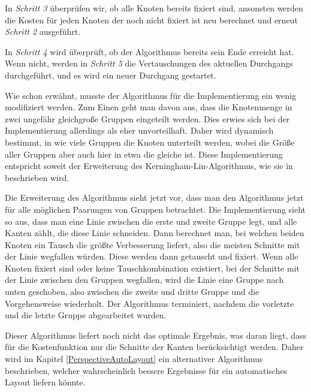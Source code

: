 In \textit{Schritt 3} überprüfen wir, ob alle Knoten bereits fixiert sind,
ansonsten werden die Kosten für jeden Knoten der noch nicht fixiert ist neu
berechnet und erneut
\textit{Schritt 2} ausgeführt.\vspace{10pt}

In \textit{Schritt 4} wird überprüft, ob der Algorithmus bereits sein Ende
erreicht hat. Wenn nicht, werden in \textit{Schritt 5} die Vertauschungen des
aktuellen Durchgangs durchgeführt, und es wird ein neuer Durchgang gestartet.\vspace{10pt}

Wie schon erwähnt, musste der Algorithmus für die Implementierung ein wenig
modifiziert werden. Zum Einen geht man davon aus, dass die
Knotenmenge in zwei ungefähr gleichgroße Gruppen eingeteilt werden. Dies erwies
sich bei der Implementierung allerdings als eher unvorteilhaft. Daher wird dynamisch
bestimmt, in wie viele Gruppen die Knoten unterteilt werden, wobei die Größe
aller Gruppen aber auch hier in etwa die gleiche ist. Diese
Implementierung entspricht soweit der Erweiterung des
Kerningham-Lin-Algorithmus, wie sie in \cite{Layout} beschrieben
wird.\vspace{10pt}

Die Erweiterung des Algorithmus sieht jetzt vor, dass man den Algorithmus jetzt
für alle möglichen Paarungen von Gruppen betrachtet. Die Implementierung
sieht so aus, dass man eine Linie zwischen die erste und zweite Gruppe legt, und
alle Kanten zählt, die diese Linie schneiden. Dann berechnet man, bei
welchen beiden Knoten ein Tausch die größte Verbesserung liefert, also die
meisten Schnitte mit der Linie wegfallen würden. Diese werden dann getauscht und
fixiert. Wenn alle Knoten fixiert sind oder keine Tauschkombination existiert,
bei der Schnitte mit der Linie zwischen den Gruppen wegfallen, wird die Linie
eine Gruppe nach unten geschoben, also zwischen die zweite und dritte Gruppe und
die Vorgehensweise wiederholt. Der Algorithmus terminiert, nachdem die vorletzte
und die letzte Gruppe abgearbeitet wurden.\vspace{10pt}

Dieser Algorithmus liefert noch nicht das optimale Ergebnis, was daran liegt,
dass für die Kostenfunktion nur die Schnitte der Kanten berücksichtigt werden.
Daher wird im Kapitel \ref{PerspectiveAutoLayout} ein alternativer Algorithmus beschrieben,
welcher wahrscheinlich bessere Ergebnisse für ein automatisches Layout liefern
könnte.\vspace{10pt}


